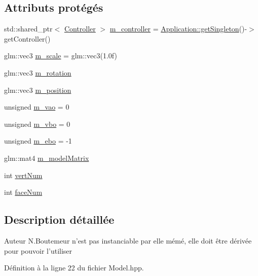 \subsection*{Attributs protégés}
\begin{DoxyCompactItemize}
\item 
std\+::shared\+\_\+ptr$<$ \hyperlink{classController}{Controller} $>$ \hyperlink{classModel_aa952b1556f55b93129bef6e5de91b2b0}{m\+\_\+controller} = \hyperlink{classApplication_afa5d5ce6c9369e1ea05ee6540fe07dc2}{Application\+::get\+Singleton}()-\/$>$get\+Controller()
\item 
glm\+::vec3 \hyperlink{classModel_abc23ecdbd0ec986ed2ccd00fe20b817a}{m\+\_\+scale} = glm\+::vec3(1.\+0f)
\item 
glm\+::vec3 \hyperlink{classModel_a5cacbaf83f7abedb413670a877ca0342}{m\+\_\+rotation}
\item 
glm\+::vec3 \hyperlink{classModel_af1de9a151d77a2a7c9448fc796c2aee1}{m\+\_\+position}
\item 
unsigned \hyperlink{classModel_acba5e05b4023cae6c5650ae839fb009f}{m\+\_\+vao} = 0
\item 
unsigned \hyperlink{classModel_a76ec368b072bc97855bd860d9eaf879b}{m\+\_\+vbo} = 0
\item 
unsigned \hyperlink{classModel_a56668d2e99c519c8dbe00c3aab4f7d09}{m\+\_\+ebo} = -\/1
\item 
glm\+::mat4 \hyperlink{classModel_a415a19bd8f5afaf29a40ddc02496b15f}{m\+\_\+model\+Matrix}
\item 
int \hyperlink{classModel_a2e6cb8d2533906b5b67ff6e46979b6ba}{vert\+Num}
\item 
int \hyperlink{classModel_a6552e6870c67e02fba57b86a09859b91}{face\+Num}
\end{DoxyCompactItemize}


\subsection{Description détaillée}
\begin{DoxyAuthor}{Auteur}
N.\+Boutemeur n'est pas instanciable par elle mémé, elle doit être dérivée pour pouvoir l'utiliser 
\end{DoxyAuthor}


Définition à la ligne 22 du fichier Model.\+hpp.



